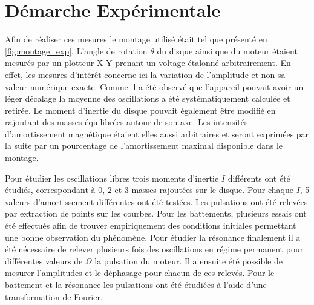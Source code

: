 \section{Démarche Expérimentale}
Afin de réaliser ces mesures le montage utilisé était tel que présenté en \autoref{fig:montage_exp}. L'angle de rotation $\theta$ du disque ainsi que du moteur étaient mesurés par un plotteur X-Y prenant un voltage étalonné arbitrairement. En effet, les mesures d'intérêt concerne ici la variation de l'amplitude et non sa valeur numérique exacte. Comme il a été observé que l'appareil pouvait avoir un léger décalage la moyenne des oscillations a été systématiquement calculée et retirée. Le moment d'inertie du disque pouvait également être modifié en rajoutant des masses équilibrées autour de son axe. Les intensités d'amortissement magnétique étaient elles aussi arbitraires et seront exprimées par la suite par un pourcentage de l'amortissement maximal disponible dans le montage.

Pour étudier les oscillations libres trois moments d'inertie $I$ différents ont été étudiés, correspondant à 0, 2 et 3 masses rajoutées sur le disque. Pour chaque $I$, 5 valeurs d'amortissement différentes ont été testées. Les pulsations ont été relevées par extraction de points sur les courbes. Pour les battements, plusieurs essais ont été effectués afin de trouver empiriquement des conditions initiales permettant une bonne observation du phénomène. Pour étudier la résonance finalement il a été nécessaire de relever plusieurs fois des oscillations en régime permanent pour différentes valeurs de $\Omega$ la pulsation du moteur. Il a ensuite été possible de mesurer l'amplitudes et le déphasage pour chacun de ces relevés. Pour le battement et la résonance les pulsations ont été étudiées à l'aide d'une transformation de Fourier.